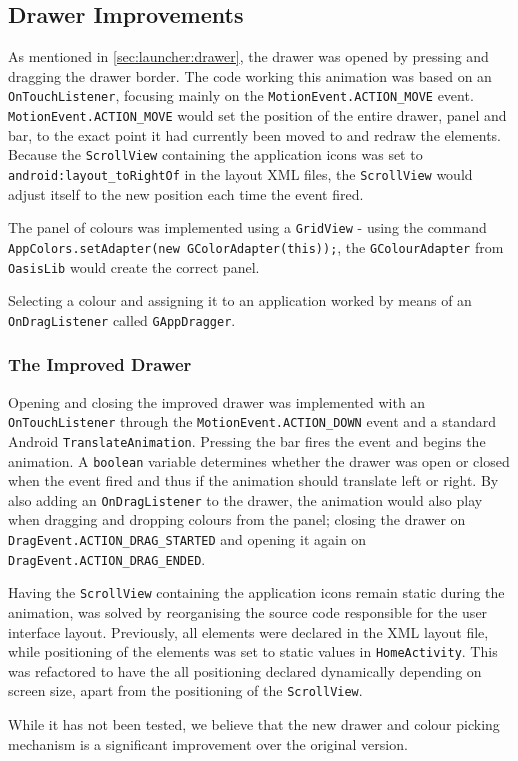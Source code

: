 \subsection{Drawer Improvements}\label{sec:developments:drawerimprovements}
As mentioned in \cref{sec:launcher:drawer}, the drawer was opened by pressing and dragging the drawer border.
The code working this animation was based on an \lstinline{OnTouchListener}, focusing mainly on the \lstinline{MotionEvent.ACTION_MOVE} event.
\lstinline{MotionEvent.ACTION_MOVE} would set the position of the entire drawer, panel and bar, to the exact point it had currently been moved to and redraw the elements.
Because the \lstinline{ScrollView} containing the application icons was set to \lstinline{android:layout_toRightOf} in the layout XML files, the \lstinline{ScrollView} would adjust itself to the new position each time the event fired.

The panel of colours was implemented using a \lstinline{GridView} - using the command \lstinline{AppColors.setAdapter(new GColorAdapter(this));}, the \lstinline{GColourAdapter} from \lstinline{OasisLib} would create the correct panel.

Selecting a colour and assigning it to an application worked by means of an \lstinline{OnDragListener} called \lstinline{GAppDragger}.

\subsubsection{The Improved Drawer}

Opening and closing the improved drawer was implemented with an \lstinline{OnTouchListener} through the \lstinline{MotionEvent.ACTION_DOWN} event and a standard Android \lstinline{TranslateAnimation}.
Pressing the bar fires the event and begins the animation.
A \lstinline{boolean} variable determines whether the drawer was open or closed when the event fired and thus if the animation should translate left or right.
By also adding an \lstinline{OnDragListener} to the drawer, the animation would also play when dragging and dropping colours from the panel; closing the drawer on \lstinline{DragEvent.ACTION_DRAG_STARTED} and opening it again on \lstinline{DragEvent.ACTION_DRAG_ENDED}.

Having the \lstinline{ScrollView} containing the application icons remain static during the animation, was solved by reorganising the source code responsible for the user interface layout. 
Previously, all elements were declared in the XML layout file, while positioning of the elements was set to static values in \lstinline{HomeActivity}.
This was refactored to have the all positioning declared dynamically depending on screen size, apart from the positioning of the \lstinline{ScrollView}.

While it has not been tested, we believe that the new drawer and colour picking mechanism is a significant improvement over the original version.

